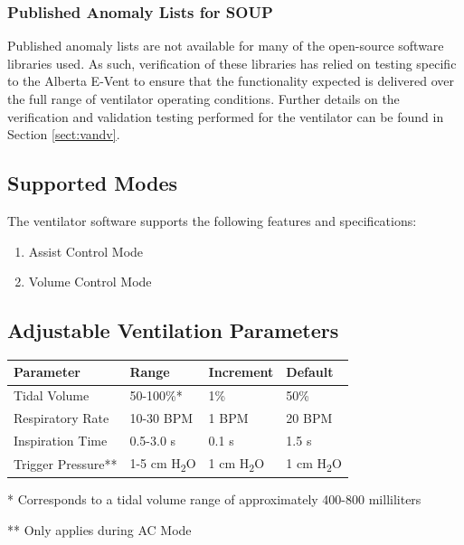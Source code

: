 \documentclass[]{article}
\begin{document}
\subsubsection{Published Anomaly Lists for SOUP}
Published anomaly lists are not available for many of the open-source software libraries used.  As such, verification of these libraries has relied on testing specific to the Alberta E-Vent to ensure that the functionality expected is delivered over the full range of ventilator operating conditions.  Further details on the verification and validation testing performed for the ventilator can be found in Section \ref{sect:vandv}.



\subsection{Supported Modes}

The ventilator software supports the following features and specifications:
\begin{enumerate}
	\item Assist Control Mode
	\item Volume Control Mode
\end{enumerate}


\subsection{Adjustable Ventilation Parameters}


\begin{center}
	\begin{table}[h]
		
	
	\begin{tabular}{ |p{4.3cm}| p{3cm}| p{3cm}|p{3cm}|}
		\hline
		\textbf{Parameter} & \textbf{Range} & \textbf{Increment}& \textbf{Default} \\
		\hline 
		Tidal Volume & 50-100\%* & 1\% & 50\% \\  
		\hline
		Respiratory Rate & 10-30 BPM  & 1 BPM & 20 BPM \\ 
		\hline   
		Inspiration Time & 0.5-3.0 s& 0.1 s & 1.5 s\\
		\hline
		Trigger Pressure** & 1-5 cm H\textsubscript{2}O & 1 cm H\textsubscript{2}O& 1 cm H\textsubscript{2}O \\
		\hline
	\end{tabular}


* Corresponds to a tidal volume range of approximately 400-800 milliliters

** Only applies during AC Mode
\end{table}
	
\end{center}
\end{document}
